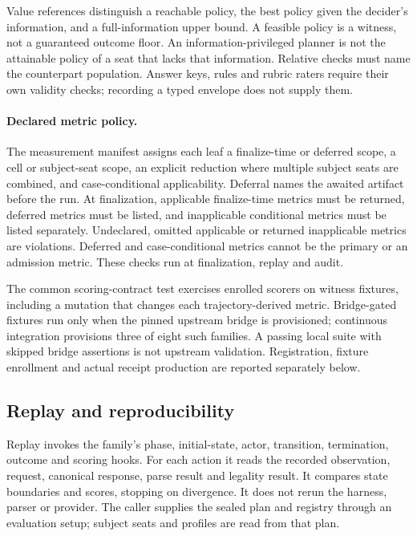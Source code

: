 Value references distinguish a reachable policy, the best policy given
the decider's information, and a full-information upper bound. A
feasible policy is a witness, not a guaranteed outcome floor. An
information-privileged planner is not the attainable policy of a seat
that lacks that information. Relative checks must name the counterpart
population. Answer keys, rules and rubric raters require their own
validity checks; recording a typed envelope does not supply them.

\paragraph{Declared metric policy.}
The measurement manifest assigns each leaf a finalize-time or deferred
scope, a cell or subject-seat scope, an explicit reduction where
multiple subject seats are combined, and case-conditional applicability.
Deferral names the awaited artifact before the run. At finalization,
applicable finalize-time metrics must be returned, deferred metrics
must be listed, and inapplicable conditional metrics must be listed
separately. Undeclared, omitted applicable or returned inapplicable
metrics are violations. Deferred and case-conditional metrics cannot
be the primary or an admission metric. These checks run at
finalization, replay and audit.

The common scoring-contract test exercises enrolled scorers on witness
fixtures, including a mutation that changes each trajectory-derived
metric. Bridge-gated fixtures run only when the pinned upstream bridge
is provisioned; continuous integration provisions three of eight such
families. A passing local suite with skipped bridge assertions is not
upstream validation. Registration, fixture enrollment and actual
receipt production are reported separately below.

\subsection{Replay and reproducibility}
\label{app:runtime-replay}

Replay invokes the family's phase, initial-state, actor, transition,
termination, outcome and scoring hooks. For each action it reads the
recorded observation, request, canonical response, parse result and
legality result. It compares state boundaries and scores, stopping on
divergence. It does not rerun the harness, parser or provider. The
caller supplies the sealed plan and registry through an evaluation
setup; subject seats and profiles are read from that plan.

